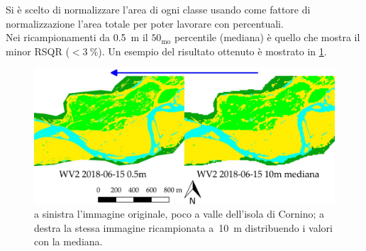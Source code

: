 %
Si è scelto di normalizzare l'area di ogni classe usando come fattore di normalizzazione l'area totale per poter lavorare con percentuali.
\\
Nei ricampionamenti da \SI{0.5}{\m} il $50_\mathrm{mo}$ percentile (mediana) è quello che mostra il minor RSQR ($<\SI{3}{\percent}$). Un esempio del risultato ottenuto è mostrato in \cref{fig:ricampionamento}.
%
\begin{figure}
	\centering
	\includegraphics[width=\textwidth]{files/ricamp_class_is_fl.jpeg}
	\caption[confronto originale - ricampionamento]{a sinistra l'immagine \WV{} originale, poco a valle dell'isola di Cornino; a destra la stessa immagine ricampionata a~\SI{10}{\m} distribuendo i valori con la mediana.}
	\label{fig:ricampionamento}
\end{figure} 
%


